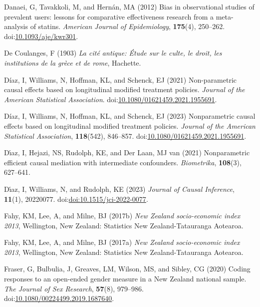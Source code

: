 \documentclass[
  single column]{article}
\newlength{\cslhangindent}
\newenvironment{CSLReferences}[2] %
 {\begin{list}{}{%
  \setlength{\itemindent}{0pt}
  \setlength{\leftmargin}{0pt}
  \setlength{\parsep}{0pt}
  \ifodd #1
   \setlength{\leftmargin}{\cslhangindent}
   \setlength{\itemindent}{-1\cslhangindent}
  \fi
  \setlength{\itemsep}{#2\baselineskip}}}
 {\end{list}}
\begin{document}
\begin{CSLReferences}{1}{0}
Danaei, G, Tavakkoli, M, and Hernán, MA (2012) Bias in observational
studies of prevalent users: lessons for comparative effectiveness
research from a meta-analysis of statins. \emph{American Journal of
Epidemiology}, \textbf{175}(4), 250--262.
doi:\href{https://doi.org/10.1093/aje/kwr301}{10.1093/aje/kwr301}.

De Coulanges, F (1903) \emph{La cité antique: Étude sur le culte, le
droit, les institutions de la grèce et de rome}, Hachette.

Díaz, I, Williams, N, Hoffman, KL, and Schenck, EJ (2021) Non-parametric
causal effects based on longitudinal modified treatment policies.
\emph{Journal of the American Statistical Association}.
doi:\href{https://doi.org/10.1080/01621459.2021.1955691}{10.1080/01621459.2021.1955691}.

Díaz, I, Williams, N, Hoffman, KL, and Schenck, EJ (2023) Nonparametric
causal effects based on longitudinal modified treatment policies.
\emph{Journal of the American Statistical Association},
\textbf{118}(542), 846--857.
doi:\href{https://doi.org/10.1080/01621459.2021.1955691}{10.1080/01621459.2021.1955691}.

Dı́az, I, Hejazi, NS, Rudolph, KE, and Der Laan, MJ van (2021)
Nonparametric efficient causal mediation with intermediate confounders.
\emph{Biometrika}, \textbf{108}(3), 627--641.

Dı́az, I, Williams, N, and Rudolph, KE (2023) \emph{Journal of Causal
Inference}, \textbf{11}(1), 20220077.
doi:\href{https://doi.org/doi:10.1515/jci-2022-0077}{doi:10.1515/jci-2022-0077}.

Fahy, KM, Lee, A, and Milne, BJ (2017b) \emph{{N}ew {Z}ealand
socio-economic index 2013}, Wellington, New Zealand: Statistics New
Zealand-Tatauranga Aotearoa.

Fahy, KM, Lee, A, and Milne, BJ (2017a) \emph{{N}ew {Z}ealand
socio-economic index 2013}, Wellington, New Zealand: Statistics New
Zealand-Tatauranga Aotearoa.

Fraser, G, Bulbulia, J, Greaves, LM, Wilson, MS, and Sibley, CG (2020)
Coding responses to an open-ended gender measure in a {N}ew {Z}ealand
national sample. \emph{The Journal of Sex Research}, \textbf{57}(8),
979--986.
doi:\href{https://doi.org/10.1080/00224499.2019.1687640}{10.1080/00224499.2019.1687640}.


\end{CSLReferences}
\end{document}
